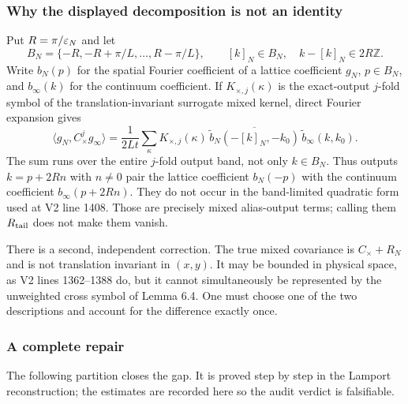 \documentclass[11pt,a4paper]{article}
\begin{document}
\subsubsection{Why the displayed decomposition is not an identity}

Put $R=\pi/\varepsilon_N$ and let
\[
 B_N=\{-R,-R+\pi/L,\ldots,R-\pi/L\},\qquad
 [k]_N\in B_N,\quad k-[k]_N\in2R\mathbb Z.
\]
Write $b_N(p)$ for the spatial Fourier coefficient of a lattice coefficient
$g_N$, $p\in B_N$, and $b_\infty(k)$ for the continuum coefficient.  If
$K_{\times,j}(\kappa)$ is the exact-output $j$-fold symbol of the translation-invariant
surrogate mixed kernel, direct Fourier expansion gives
\[
 \langle g_N,C_\times^jg_\infty\rangle
 =\frac1{2Lt}\sum_{\kappa}
 K_{\times,j}(\kappa)\,
 \overline{\widetilde b_N(-[k]_N,-k_0)}\,
 \widetilde b_\infty(k,k_0).
 \tag{2.1}
\]
The sum runs over the entire $j$-fold output band, not only $k\in B_N$.  Thus outputs
$k=p+2Rn$ with $n\ne0$ pair the lattice coefficient $b_N(-p)$ with the continuum
coefficient $b_\infty(p+2Rn)$.  They do not occur in the band-limited quadratic form
used at V2 line 1408.  Those are precisely mixed alias-output terms; calling them
$R_{\rm tail}$ does not make them vanish.

There is a second, independent correction.  The true mixed covariance is
$C_\times+R_N$ and is not translation invariant in $(x,y)$.  It may be bounded in
physical space, as V2 lines 1362--1388 do, but it cannot simultaneously be represented
by the unweighted cross symbol of Lemma 6.4.  One must choose one of the two descriptions
and account for the difference exactly once.

\subsubsection{A complete repair}

The following partition closes the gap.  It is proved step by step in the Lamport
reconstruction; the estimates are recorded here so the audit verdict is falsifiable.
\end{document}
